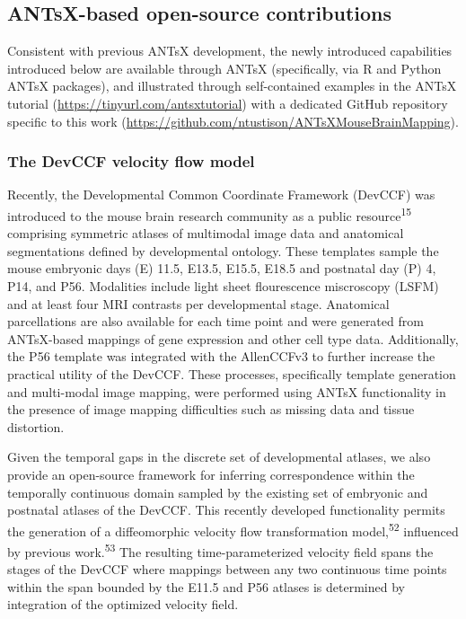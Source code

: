 \documentclass[
  12pt,
]{article}
\begin{document}
\hypertarget{antsx-based-open-source-contributions}{%
\subsection{ANTsX-based open-source
contributions}\label{antsx-based-open-source-contributions}}

Consistent with previous ANTsX development, the newly introduced
capabilities introduced below are available through ANTsX (specifically,
via R and Python ANTsX packages), and illustrated through self-contained
examples in the ANTsX tutorial (\url{https://tinyurl.com/antsxtutorial})
with a dedicated GitHub repository specific to this work
(\url{https://github.com/ntustison/ANTsXMouseBrainMapping}).

\hypertarget{the-devccf-velocity-flow-model}{%
\subsubsection{The DevCCF velocity flow
model}\label{the-devccf-velocity-flow-model}}

Recently, the Developmental Common Coordinate Framework (DevCCF) was
introduced to the mouse brain research community as a public
resource\textsuperscript{15} comprising symmetric atlases of multimodal
image data and anatomical segmentations defined by developmental
ontology. These templates sample the mouse embryonic days (E) 11.5,
E13.5, E15.5, E18.5 and postnatal day (P) 4, P14, and P56. Modalities
include light sheet flourescence miscroscopy (LSFM) and at least four
MRI contrasts per developmental stage. Anatomical parcellations are also
available for each time point and were generated from ANTsX-based
mappings of gene expression and other cell type data. Additionally, the
P56 template was integrated with the AllenCCFv3 to further increase the
practical utility of the DevCCF. These processes, specifically template
generation and multi-modal image mapping, were performed using ANTsX
functionality in the presence of image mapping difficulties such as
missing data and tissue distortion.

Given the temporal gaps in the discrete set of developmental atlases, we
also provide an open-source framework for inferring correspondence
within the temporally continuous domain sampled by the existing set of
embryonic and postnatal atlases of the DevCCF. This recently developed
functionality permits the generation of a diffeomorphic velocity flow
transformation model,\textsuperscript{52} influenced by previous
work.\textsuperscript{53} The resulting time-parameterized velocity
field spans the stages of the DevCCF where mappings between any two
continuous time points within the span bounded by the E11.5 and P56
atlases is determined by integration of the optimized velocity field.
\end{document}
